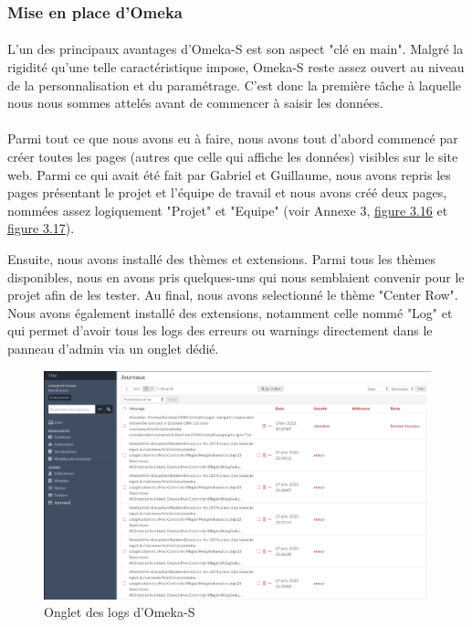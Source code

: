 \subsubsection{Mise en place d'Omeka}

\paragraph{} \hspace{10mm}
L'un des principaux avantages d'Omeka-S est son aspect "clé en main". Malgré la rigidité qu'une telle caractéristique impose, Omeka-S reste assez ouvert au niveau de la personnalisation et du paramétrage. C'est donc la première tâche à laquelle nous nous sommes attelés avant de commencer à saisir les données. 

\paragraph{} \hspace{10mm}
Parmi tout ce que nous avons eu à faire, nous avons tout d'abord commencé par créer toutes les pages (autres que celle qui affiche les données) visibles sur le site web. Parmi ce qui avait été fait par Gabriel et Guillaume, nous avons repris les pages présentant le projet et l'équipe de travail et nous avons créé deux pages, nommées assez logiquement "Projet" et "Equipe" (voir Annexe 3, \hyperref[fig:pageProjetOmeka]{figure 3.16} et \hyperref[fig:pageEquipeOmeka]{figure 3.17}).

Ensuite, nous avons installé des thèmes et extensions. Parmi tous les thèmes disponibles, nous en avons pris quelques-uns qui nous semblaient convenir pour le projet afin de les tester. Au final, nous avons selectionné le thème "Center Row". Nous avons également installé des extensions, notamment celle nommé "Log" et qui permet d'avoir tous les logs des erreurs ou warnings directement dans le panneau d'admin via un onglet dédié.

\begin{figure} [H]
    \centering
    \includegraphics[width=1\textwidth]{assets/omeka/onglet_logs_omeka.png}
    \caption{Onglet des logs d'Omeka-S}
    \label{fig:ongletLogsOmeka}
\end{figure}

